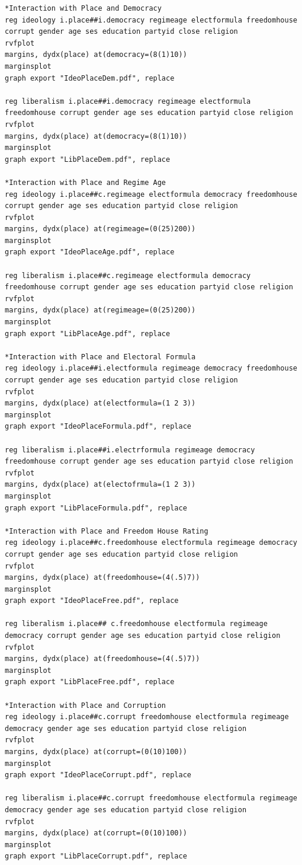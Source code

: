 \documentclass[12pt, titlepage]{article}
\begin{document}
\begin{lstlisting}
*Interaction with Place and Democracy
reg ideology i.place##i.democracy regimeage electformula freedomhouse corrupt gender age ses education partyid close religion
rvfplot
margins, dydx(place) at(democracy=(8(1)10))
marginsplot
graph export "IdeoPlaceDem.pdf", replace

reg liberalism i.place##i.democracy regimeage electformula freedomhouse corrupt gender age ses education partyid close religion
rvfplot
margins, dydx(place) at(democracy=(8(1)10))
marginsplot
graph export "LibPlaceDem.pdf", replace

*Interaction with Place and Regime Age
reg ideology i.place##c.regimeage electformula democracy freedomhouse corrupt gender age ses education partyid close religion
rvfplot
margins, dydx(place) at(regimeage=(0(25)200))
marginsplot
graph export "IdeoPlaceAge.pdf", replace

reg liberalism i.place##c.regimeage electformula democracy freedomhouse corrupt gender age ses education partyid close religion
rvfplot
margins, dydx(place) at(regimeage=(0(25)200))
marginsplot
graph export "LibPlaceAge.pdf", replace

*Interaction with Place and Electoral Formula
reg ideology i.place##i.electformula regimeage democracy freedomhouse corrupt gender age ses education partyid close religion
rvfplot
margins, dydx(place) at(electformula=(1 2 3))
marginsplot
graph export "IdeoPlaceFormula.pdf", replace

reg liberalism i.place##i.electrformula regimeage democracy freedomhouse corrupt gender age ses education partyid close religion
rvfplot
margins, dydx(place) at(electofrmula=(1 2 3))
marginsplot
graph export "LibPlaceFormula.pdf", replace

*Interaction with Place and Freedom House Rating
reg ideology i.place##c.freedomhouse electformula regimeage democracy corrupt gender age ses education partyid close religion
rvfplot
margins, dydx(place) at(freedomhouse=(4(.5)7))
marginsplot
graph export "IdeoPlaceFree.pdf", replace

reg liberalism i.place## c.freedomhouse electformula regimeage democracy corrupt gender age ses education partyid close religion
rvfplot
margins, dydx(place) at(freedomhouse=(4(.5)7))
marginsplot
graph export "LibPlaceFree.pdf", replace

*Interaction with Place and Corruption
reg ideology i.place##c.corrupt freedomhouse electformula regimeage democracy gender age ses education partyid close religion
rvfplot
margins, dydx(place) at(corrupt=(0(10)100))
marginsplot
graph export "IdeoPlaceCorrupt.pdf", replace

reg liberalism i.place##c.corrupt freedomhouse electformula regimeage democracy gender age ses education partyid close religion
rvfplot
margins, dydx(place) at(corrupt=(0(10)100))
marginsplot
graph export "LibPlaceCorrupt.pdf", replace
\end{lstlisting}
\end{document}
